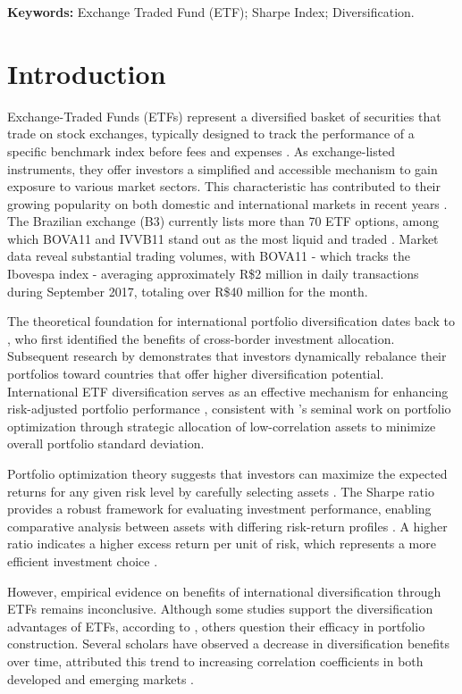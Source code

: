 \documentclass{article}
\begin{document}
\vspace{0.5cm}
\noindent\textbf{Keywords:} Exchange Traded Fund (ETF); Sharpe Index; Diversification.

\section{Introduction}
Exchange-Traded Funds (ETFs) represent a diversified basket of securities that trade on stock exchanges, typically designed to track the performance of a specific benchmark index before fees and expenses \citep{B3_2022}. As exchange-listed instruments, they offer investors a simplified and accessible mechanism to gain exposure to various market sectors. This characteristic has contributed to their growing popularity on both domestic and international markets in recent years \citep{Yoshinaga_Junior_2019}. The Brazilian exchange (B3) currently lists more than 70 ETF options, among which BOVA11 and IVVB11 stand out as the most liquid and traded \citep{Yoshinaga_Junior_2019}. Market data reveal substantial trading volumes, with BOVA11 - which tracks the Ibovespa index - averaging approximately R\$2 million in daily transactions during September 2017, totaling over R\$40 million for the month.

The theoretical foundation for international portfolio diversification dates back to \cite{Grubel_1968}, who first identified the benefits of cross-border investment allocation. Subsequent research by \cite{Coeurdacier_Guibaud_2011} demonstrates that investors dynamically rebalance their portfolios toward countries that offer higher diversification potential. International ETF diversification serves as an effective mechanism for enhancing risk-adjusted portfolio performance \cite {Solnik_1974}, consistent with \cite {Markowitz_1952}'s seminal work on portfolio optimization through strategic allocation of low-correlation assets to minimize overall portfolio standard deviation.

Portfolio optimization theory suggests that investors can maximize the expected returns for any given risk level by carefully selecting assets \citep{Markowitz_1952}. The Sharpe ratio provides a robust framework for evaluating investment performance, enabling comparative analysis between assets with differing risk-return profiles \citep{Elton_2014}. A higher ratio indicates a higher excess return per unit of risk, which represents a more efficient investment choice \citep{Ross_Westerfield_Jaffe_2007}.

However, empirical evidence on benefits of international diversification through ETFs remains inconclusive. Although some studies support the diversification advantages of ETFs, according to \cite{Neves_Fernandes_Martins_2019}, others question their efficacy in portfolio construction. Several scholars have observed a decrease in diversification benefits over time, attributed this trend to increasing correlation coefficients in both developed and emerging markets \citep{Bekaert_Hodrick_Zhang_2009, Chiou_2008, Christoffersen_Errunza_2012}.
\end{document}
